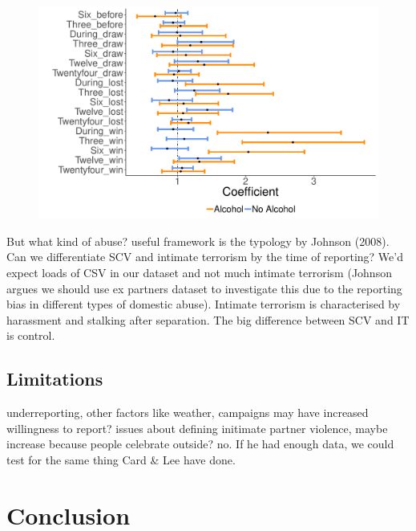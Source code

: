 \documentclass[12pt, letterpaper]{article}
\begin{document}
\begin{figure}[htb!]
\centering
\includegraphics[width=1\textwidth]{Threehours.pdf}
\label{fig:DA_compare}
\end{figure}

\newpage





But what kind of abuse? useful framework is the typology by Johnson (2008). Can we differentiate SCV and intimate terrorism by the time of reporting? We'd expect loads of CSV in our dataset and not much intimate terrorism (Johnson argues we should use ex partners dataset to investigate this due to the reporting bias in different types of domestic abuse). Intimate terrorism is characterised by harassment and stalking after separation. The big difference between SCV and IT is control. 




\subsection{Limitations}
underreporting, other factors like weather, campaigns may have increased willingness to report? issues about defining initimate partner violence, maybe increase because people celebrate outside? no.
If he had enough data, we could test for the same thing Card \& Lee have done.


\section{Conclusion}
\end{document}

